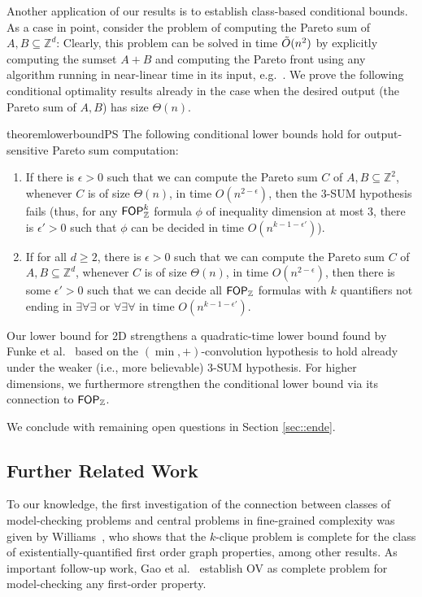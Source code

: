 Another application of our results is to establish class-based conditional bounds. As a case in point, consider the problem of computing the Pareto sum of $A,B\subseteq \mathbb{Z}^d$: Clearly, this problem can be solved in time $\tilde{O}(n^2)$ by explicitly computing the sumset $A+B$ and computing the Pareto front using any algorithm running in near-linear time in its input, e.g.~\cite{DBLP:conf/stoc/GabowBT84}. We prove the following conditional optimality results already in the case when the desired output (the Pareto sum of $A,B$) has size $\Theta(n)$. 
\begin{restatable}{theorem}{lowerboundPS}
	The following conditional lower bounds hold for output-sensitive Pareto sum computation:
	\begin{enumerate}
		\item If there is $\epsilon > 0$ such that we can compute the Pareto sum $C$ of $A,B\subseteq \mathbb{Z}^2$, whenever $C$ is of size $\Theta(n)$, in time $O(n^{2-\epsilon})$, then the $3$-SUM hypothesis fails (thus, for any $\mathsf{FOP}_{\mathbb{Z}}^k$ formula $\phi$ of inequality dimension at most 3, there is $\epsilon'>0$ such that $\phi$ can be decided in time $O(n^{k-1-\epsilon'})$). 
		\item If for all $d\ge 2$, there is $\epsilon > 0$ such that we can compute the Pareto sum $C$ of $A,B\subseteq \mathbb{Z}^d$, whenever $C$ is of size $\Theta(n)$, in time $O(n^{2-\epsilon})$, then there is some $\epsilon' > 0$ such that we can decide all $\mathsf{FOP}_{\mathbb{Z}}$ formulas with $k$ quantifiers not ending in $\exists \forall \exists$ or $\forall \exists \forall$ in time $O(n^{k-1-\epsilon'})$. 
	\end{enumerate}
	\end{restatable}

Our lower bound for 2D strengthens a quadratic-time lower bound found by Funke et al.~\cite{HespeSST24-PC} based on the $(\min,+)$-convolution hypothesis to hold already under the weaker (i.e., more believable) $3$-SUM hypothesis. For higher dimensions, we furthermore strengthen the conditional lower bound via its connection to $\mathsf{FOP}_{\mathbb{Z}}$.

We conclude with remaining open questions in Section \ref{sec::ende}.







\subsection{Further Related Work}\label{sec:relatedWork}
To our knowledge, the first investigation of the connection between classes of model-checking problems and central problems in fine-grained complexity was given by Williams~\cite{DBLP:conf/csl/Williams14}, who shows that the $k$-clique problem is complete for the class of existentially-quantified first order graph properties, among other results. As important follow-up work, Gao et al.~\cite{GaoIKW19} establish OV as complete problem for model-checking any first-order property.


